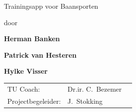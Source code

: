 \begin{titlepage}

\begin{center}


\vspace*{2\bigskipamount}

{\makeatletter
\titlestyle\color{tudelft-cyan}\Huge\@title
\makeatother}

\bigskip
\bigskip

{\makeatletter
\titlestyle\color{tudelft-cyan}\LARGE Trainingsapp voor Baansporten
\makeatother}

{\makeatletter
\ifx\@subtitle\undefined\else
    \bigskip
    \titlefont\titleshape\Large\@subtitle
\fi
\makeatother}

\bigskip
\bigskip

door

\bigskip
\bigskip

{\makeatletter
\titlefont\Large\bfseries Herman Banken
\makeatother}

\bigskip

{\makeatletter
\titlefont\Large\bfseries Patrick van Hesteren
\makeatother}

\bigskip

{\makeatletter
\titlefont\Large\bfseries Hylke Visser
\makeatother}

\vfill

\begin{tabular}{lll}
    TU Coach: & Dr.ir. C.\ Bezemer \\
    Projectbegeleider: & J.\ Stokking
\end{tabular}


\end{center}
\end{titlepage}
